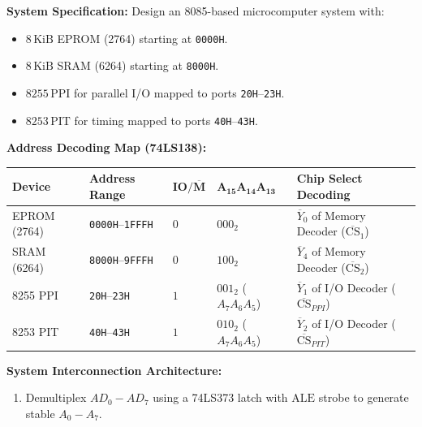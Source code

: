 \documentclass[12pt,a4paper]{article}
\begin{document}
\begin{tcolorbox}[examplebox, title={Complete 8085 Microprocessor System Interfacing Design}, breakable]
\textbf{System Specification:} Design an 8085-based microcomputer system with:
\begin{itemize}[leftmargin=*]
  \item $8\,\mathrm{KiB}$ EPROM (2764) starting at \texttt{0000H}.
  \item $8\,\mathrm{KiB}$ SRAM (6264) starting at \texttt{8000H}.
  \item $8255\,\mathrm{PPI}$ for parallel I/O mapped to ports \texttt{20H}--\texttt{23H}.
  \item $8253\,\mathrm{PIT}$ for timing mapped to ports \texttt{40H}--\texttt{43H}.
\end{itemize}
\par\vspace{4pt}
\textbf{Address Decoding Map (74LS138):}
\par\vspace{4pt}
\begingroup
\setlength{\extrarowheight}{2.5pt}
\noindent\begin{tabularx}{\linewidth}{|B{2.2cm}|B{3.2cm}|B{2.0cm}|B{2.4cm}|Y|}
\hline
\textbf{Device} & \textbf{Address Range} & $\mathbf{IO/\overline{M}}$ & $\mathbf{A_{15}A_{14}A_{13}}$ & \textbf{Chip Select Decoding} \\ \hline
EPROM (2764) & \texttt{0000H}--\texttt{1FFFH} & $0$ & $000_2$ & $\overline{Y}_0$ of Memory Decoder ($\overline{\mathrm{CS}}_1$) \\ \hline
SRAM (6264) & \texttt{8000H}--\texttt{9FFFH} & $0$ & $100_2$ & $\overline{Y}_4$ of Memory Decoder ($\overline{\mathrm{CS}}_2$) \\  PPI & \texttt{20H}--\texttt{23H} & $1$ & $001_2$ ($A_7A_6A_5$) & $\overline{Y}_1$ of I/O Decoder ($\overline{\mathrm{CS}}_{PPI}$) \\  PIT & \texttt{40H}--\texttt{43H} & $1$ & $010_2$ ($A_7A_6A_5$) & $\overline{Y}_2$ of I/O Decoder ($\overline{\mathrm{CS}}_{PIT}$) \\ \hline
\end{tabularx}\par
\endgroup
\par\vspace{6pt}
\textbf{System Interconnection Architecture:}
\begin{enumerate}[leftmargin=*]
  \item Demultiplex $AD_0-AD_7$ using a 74LS373 latch with $\mathrm{ALE}$ strobe to generate stable $A_0-A_7$.

\end{enumerate}
\end{tcolorbox}
\end{document}
